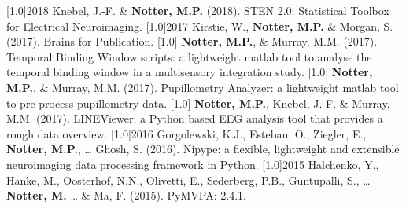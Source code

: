 \documentclass[english]{cv-style}
\begin{document}
\begin{publist}
\publications
  {\scalebox{.8}[1.0]{2018}}
  {Knebel, J.-F. \& \textbf{Notter, M.P.} (2018). STEN 2.0: Statistical Toolbox for Electrical Neuroimaging. \color{gray}}
\publications
  {\scalebox{.8}[1.0]{2017}}
  {Kirstie, W., \textbf{Notter, M.P.} \& Morgan, S. (2017). Brains for Publication. \color{gray}}
\publications
  {\scalebox{.8}[1.0]{}}
  {\textbf{Notter, M.P.}, \& Murray, M.M. (2017). Temporal Binding Window scripts: a lightweight matlab tool to analyse the temporal binding window in a multisensory integration study. \color{gray}}
\publications
  {\scalebox{.8}[1.0]{}}
  {\textbf{Notter, M.P.}, \& Murray, M.M. (2017). Pupillometry Analyzer: a lightweight matlab tool to pre-process pupillometry data. \color{gray}}
\publications
  {\scalebox{.8}[1.0]{}}
  {\textbf{Notter, M.P.}, Knebel, J.-F. \& Murray, M.M. (2017). LINEViewer: a Python based EEG analysis tool that provides a rough data overview. \color{gray}}
\publications
  {\scalebox{.8}[1.0]{2016}}
  {Gorgolewski, K.J., Esteban, O., Ziegler, E., \textbf{Notter, M.P.}, … Ghosh, S. (2016). Nipype: a flexible, lightweight and extensible neuroimaging data processing framework in Python. \color{gray}}
\publications
  {\scalebox{.8}[1.0]{2015}}
  {Halchenko, Y., Hanke, M., Oosterhof, N.N., Olivetti, E., Sederberg, P.B., Guntupalli, S., … \textbf{Notter, M.} … \& Ma, F. (2015). PyMVPA: 2.4.1. \color{gray}}
\end{publist}

\newpage

\end{document}
